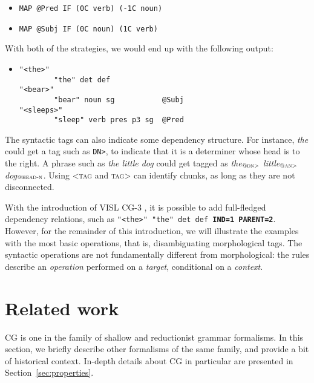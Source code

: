 \begin{itemize}
\itemsep1pt\parskip0pt
\item[] \texttt{MAP @Pred IF (0C verb) (-1C noun)}
\item[] \texttt{MAP @Subj IF (0C noun) (1C verb)}
\end{itemize}

\noindent With both of the strategies, we would end up with the
following output:

\begin{itemize}
\itemsep1pt\parskip0pt
\item[] \begin{verbatim}
"<the>"
        "the" det def            
"<bear>"
        "bear" noun sg           @Subj 
"<sleeps>"
        "sleep" verb pres p3 sg  @Pred

\end{verbatim}
\end{itemize}

The syntactic tags can also indicate some dependency structure. For
instance, \emph{the} could get a tag such as
\texttt{DN\textgreater}, to indicate that it is a determiner whose
head is to the right. A phrase such as \emph{the little dog} could get
tagged as  \emph{the}$_{\text{\sc @dn>}}$ \emph{little}$_{\text{\sc @an>}}$ \emph{dog}$_{\text{\sc @head-n}}$.
Using \textsc{\textless{}tag} and \textsc{tag\textgreater} can identify
chunks, as long as they are not disconnected.

With the introduction of VISL CG-3 \cite{vislcg3,bick2015}, 
it is possible to add full-fledged dependency relations, 
such as \texttt{"<the>" "the" det def  \textbf{IND=1 PARENT=2}}. 
However, 
for the remainder of this introduction, we will illustrate the examples with the 
most basic operations, that is, disambiguating morphological tags.
The syntactic operations are not fundamentally
different from morphological: the rules describe an \emph{operation}
performed on a \emph{target}, conditional on a \emph{context}.


\section{Related work}

CG is one in the family of shallow and reductionist grammar formalisms. In this section, we briefly describe other formalisms of the same family, and provide a bit of historical context. In-depth details about CG in particular are presented in Section~\ref{sec:properties}.

